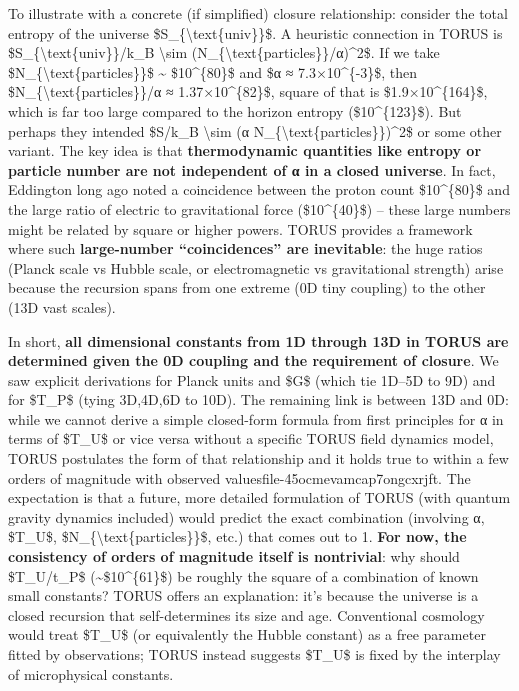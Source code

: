 \documentclass[]{article}
\begin{document}
To illustrate with a concrete (if simplified) closure relationship:
consider the total entropy of the universe
\$S\_\{\textbackslash{}text\{univ\}\}\$. A heuristic connection in TORUS
is \$S\_\{\textbackslash{}text\{univ\}\}/k\_B \textbackslash{}sim
(N\_\{\textbackslash{}text\{particles\}\}/α)\^{}2\$​. If we take
\$N\_\{\textbackslash{}text\{particles\}\}\$ \textasciitilde{}
\$10\^{}\{80\}\$ and \$α ≈ 7.3×10\^{}\{-3\}\$, then
\$N\_\{\textbackslash{}text\{particles\}\}/α ≈ 1.37×10\^{}\{82\}\$,
square of that is \$1.9×10\^{}\{164\}\$, which is far too large compared
to the horizon entropy (\$10\^{}\{123\}\$). But perhaps they intended
\$S/k\_B \textbackslash{}sim (α
N\_\{\textbackslash{}text\{particles\}\})\^{}2\$ or some other variant​.
The key idea is that \textbf{thermodynamic quantities like entropy or
particle number are not independent of α in a closed universe}. In fact,
Eddington long ago noted a coincidence between the proton count
\$10\^{}\{80\}\$ and the large ratio of electric to gravitational force
(\$10\^{}\{40\}\$) -- these large numbers might be related by square or
higher powers. TORUS provides a framework where such
\textbf{large-number ``coincidences'' are inevitable}: the huge ratios
(Planck scale vs Hubble scale, or electromagnetic vs gravitational
strength) arise because the recursion spans from one extreme (0D tiny
coupling) to the other (13D vast scales).

In short, \textbf{all dimensional constants from 1D through 13D in TORUS
are determined given the 0D coupling and the requirement of closure}. We
saw explicit derivations for Planck units and \$G\$ (which tie 1D--5D to
9D) and for \$T\_P\$ (tying 3D,4D,6D to 10D). The remaining link is
between 13D and 0D: while we cannot derive a simple closed-form formula
from first principles for α in terms of \$T\_U\$ or vice versa without a
specific TORUS field dynamics model, TORUS postulates the form of that
relationship and it holds true to within a few orders of magnitude with
observed values​file-45ocmevamcap7ongcxrjft. The expectation is that a
future, more detailed formulation of TORUS (with quantum gravity
dynamics included) would predict the exact combination (involving α,
\$T\_U\$, \$N\_\{\textbackslash{}text\{particles\}\}\$, etc.) that comes
out to 1. \textbf{For now, the consistency of orders of magnitude itself
is nontrivial}: why should \$T\_U/t\_P\$
(\textasciitilde{}\$10\^{}\{61\}\$) be roughly the square of a
combination of known small constants? TORUS offers an explanation: it's
because the universe is a closed recursion that self-determines its size
and age. Conventional cosmology would treat \$T\_U\$ (or equivalently
the Hubble constant) as a free parameter fitted by observations; TORUS
instead suggests \$T\_U\$ is fixed by the interplay of microphysical
constants.
\end{document}
